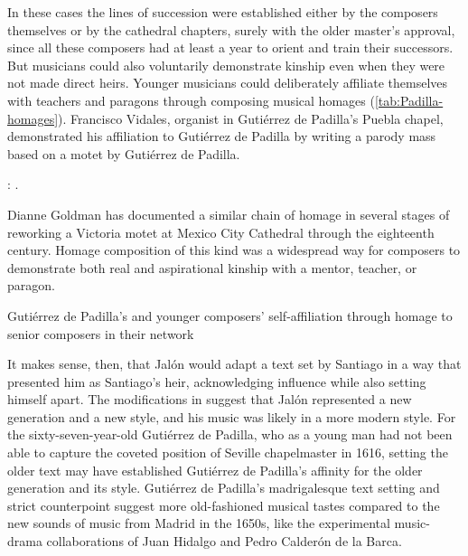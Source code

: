 In these cases the lines of succession were established either by the composers
themselves or by the cathedral chapters, surely with the older master's
approval, since all these composers had at least a year to orient and train
their successors.
But musicians could also voluntarily demonstrate kinship even when they were not
made direct heirs. 
Younger musicians could deliberately affiliate themselves with teachers and
paragons through composing musical homages (\cref{tab:Padilla-homages}).
Francisco Vidales, organist in Gutiérrez de Padilla's Puebla chapel,
demonstrated his affiliation to Gutiérrez de Padilla by writing a parody mass
based on a motet by Gutiérrez de Padilla.%
\begin{Footnote}
    \Autocite{Koegel:Padilla}: .
\end{Footnote}
Dianne Goldman has documented a similar chain of homage in several stages of
reworking a Victoria motet at Mexico City Cathedral through the eighteenth
century.%
    \Autocite{Goldman:StileAntico}
Homage composition of this kind was a widespread way for composers to
demonstrate both real and aspirational kinship with a mentor, teacher, or
paragon.

\begin{table}
    \caption{Gutiérrez de Padilla's  and younger composers' self-affiliation
    through homage to senior composers in their network}
  
    \label{tab:Padilla-homages}
\end{table}

It makes sense, then, that Jalón would adapt a text set by Santiago in a way
that presented him as Santiago's heir, acknowledging influence while also
setting himself apart.
The modifications in  suggest that Jalón
represented a new generation and a new style, and his music was likely in a more
modern style.
For the sixty-seven-year-old Gutiérrez de Padilla, who as a young man had not been able to
capture the coveted position of Seville chapelmaster in 1616, setting the older
text may have established Gutiérrez de Padilla's affinity for the older generation and its
style.
Gutiérrez de Padilla's madrigalesque text setting and strict counterpoint suggest more
old-fashioned musical tastes compared to the new sounds of music from Madrid in
the 1650s, like the experimental music-drama collaborations of Juan Hidalgo and
Pedro Calderón de la Barca.%
    \Autocite{Stein:Songs}

